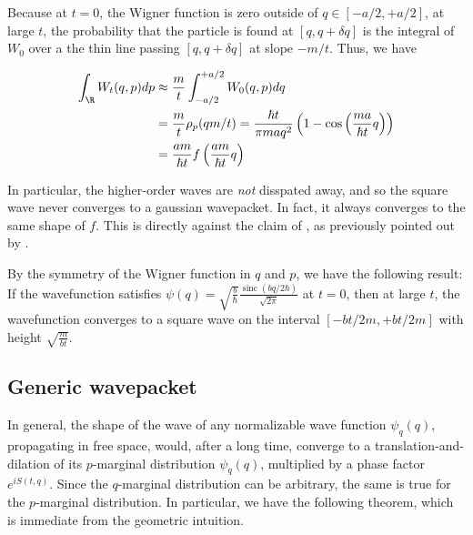 {Because at $t=0$, the Wigner function is zero outside of
$q \in [-a/2, +a/2]$, at large $t$, the probability that the
particle is found at $[q, q + \delta q]$ is the integral of $W_0$
over a the thin line passing $[q, q + \delta q]$ at slope $-m/t$.
Thus, we have

$$
\begin{aligned}
\int_\R W_t(q, p)dp 
    &\approx \frac mt\int_{-a/2}^{+a/2} W_0(q, p)dq \\
    &= \frac{m}{t} \rho_p(qm/t) = \frac{\hbar t}{\pi m a q^2} \left(1 - \cos \left( \frac{ma}{\hbar t} q\right)\right) \\
    &= \frac{am}{\hbar t} f \left(\frac{am}{\hbar t} q\right)
\end{aligned}
$$

In particular, the higher-order waves are \emph{not} disspated away, and
so the square wave never converges to a gaussian wavepacket. In fact, it
always converges to the same shape of $f$. This is directly against
the claim of \cite{mitaDispersionNonGaussianFree2007}, as previously
pointed out by \cite{andrewsEvolutionFreeWave2008}.

By the symmetry of the Wigner function in $q$ and $p$, we have the
following result: If the wavefunction satisfies
$\psi(q) = \sqrt{\frac{b}{\hbar} }\frac{\operatorname{sinc}(bq/2 \hbar)}{\sqrt{2\pi}}$
at $t=0$, then at large $t$, the wavefunction converges to a square
wave on the interval $[-bt/2m, +bt/2m]$ with height
$\sqrt{\frac{m}{bt}}$.

\subsection{Generic wavepacket}

In general, the shape of the wave of any normalizable wave function
$\psi_q(q)$, propagating in free space, would, after a long time,
converge to a translation-and-dilation of its $p$-marginal
distribution $\psi_q(q)$, multiplied by a phase factor
$e^{iS(t, q)}$. Since the $q$-marginal distribution can be
arbitrary, the same is true for the $p$-marginal distribution. In
particular, we have the following theorem, which is immediate from the
geometric intuition.

\leavevmode{}}
